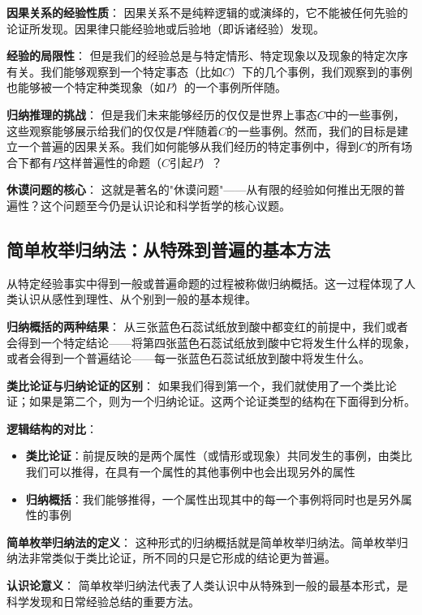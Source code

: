 \begin{theorembox}[title=从经验到普遍性的认识论挑战]
\textbf{因果关系的经验性质}：
因果关系不是纯粹逻辑的或演绎的，它不能被任何先验的论证所发现。因果律只能经验地或后验地（即诉诸经验）发现。

\textbf{经验的局限性}：
但是我们的经验总是与特定情形、特定现象以及现象的特定次序有关。我们能够观察到一个特定事态（比如$C$）下的几个事例，我们观察到的事例也能够被一个特定种类现象（如$P$）的一个事例所伴随。

\textbf{归纳推理的挑战}：
但是我们未来能够经历的仅仅是世界上事态$C$中的一些事例，这些观察能够展示给我们的仅仅是$P$伴随着$C$的一些事例。然而，我们的目标是建立一个普遍的因果关系。我们如何能够从我们经历的特定事例中，得到$C$的所有场合下都有$P$这样普遍性的命题（$C$引起$P$）？

\textbf{休谟问题的核心}：
这就是著名的"休谟问题"——从有限的经验如何推出无限的普遍性？这个问题至今仍是认识论和科学哲学的核心议题。
\end{theorembox}

\subsection{简单枚举归纳法：从特殊到普遍的基本方法}

\begin{theorembox}[title=归纳概括的理论基础]
从特定经验事实中得到一般或普遍命题的过程被称做归纳概括。这一过程体现了人类认识从感性到理性、从个别到一般的基本规律。

\textbf{归纳概括的两种结果}：
从三张蓝色石蕊试纸放到酸中都变红的前提中，我们或者会得到一个特定结论——将第四张蓝色石蕊试纸放到酸中它将发生什么样的现象，或者会得到一个普遍结论——每一张蓝色石蕊试纸放到酸中将发生什么。

\textbf{类比论证与归纳论证的区别}：
如果我们得到第一个，我们就使用了一个类比论证；如果是第二个，则为一个归纳论证。这两个论证类型的结构在下面得到分析。

\textbf{逻辑结构的对比}：
\begin{itemize}
\item \textbf{类比论证}：前提反映的是两个属性（或情形或现象）共同发生的事例，由类比我们可以推得，在具有一个属性的其他事例中也会出现另外的属性
\item \textbf{归纳概括}：我们能够推得，一个属性出现其中的每一个事例将同时也是另外属性的事例
\end{itemize}

\textbf{简单枚举归纳法的定义}：
这种形式的归纳概括就是简单枚举归纳法。简单枚举归纳法非常类似于类比论证，所不同的只是它形成的结论更为普遍。

\textbf{认识论意义}：
简单枚举归纳法代表了人类认识中从特殊到一般的最基本形式，是科学发现和日常经验总结的重要方法。
\end{theorembox}

